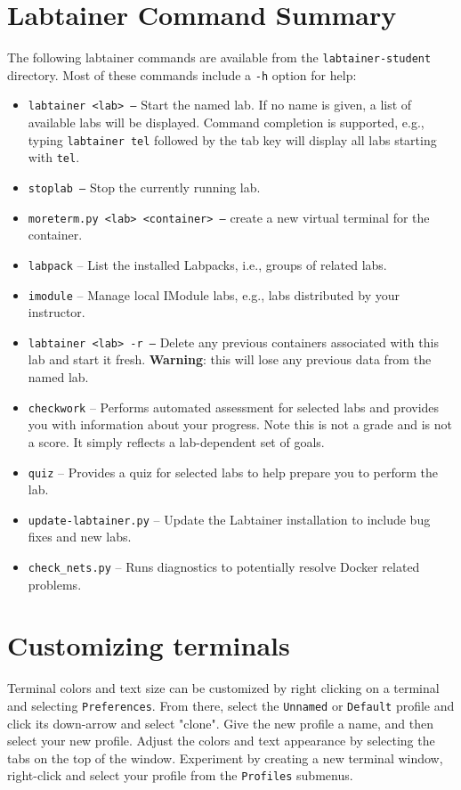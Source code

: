 \documentclass[12pt]{article}
\begin{document}
\pagebreak
\begin{appendices}
{}
\setcounter{page}{3}
\section{Labtainer Command Summary}
\label{sec:appendixA}
The following labtainer commands are available from the \texttt{labtainer-student}
directory.  Most of these commands include a {\tt -h} option for help:
\begin{itemize}
\item \texttt{labtainer <lab> --}
Start the named lab.  If no name is given, a list of available labs will be displayed. Command completion is
supported, e.g., typing {\tt labtainer tel} followed by the tab key will display all labs starting with {\tt tel}.
\item \texttt{stoplab  --} Stop the currently running lab.
\item \texttt{moreterm.py <lab> <container> --} create a new virtual terminal for the container.
\item \texttt{labpack} -- List the installed Labpacks, i.e., groups of related labs.
\item \texttt{imodule} -- Manage local IModule labs, e.g., labs distributed by your instructor.
\item \texttt{labtainer <lab> -r --}
Delete any previous containers associated with this lab and start it fresh.  \textbf{Warning}: this will lose any
previous data from the named lab.
\item \texttt{checkwork} -- Performs automated assessment for selected labs and provides you with information about your progress.
Note this is not a grade and is not a score.  It simply reflects a lab-dependent set of goals.
\item \texttt{quiz} -- Provides a quiz for selected labs to help prepare you to perform the lab.
\item \texttt{update-labtainer.py} -- Update the Labtainer installation to include bug fixes and new labs.
\item \texttt{check\_nets.py} -- Runs diagnostics to potentially resolve Docker related problems.

\end{itemize}

\section{Customizing terminals}
\label{sec:appendixB}
Terminal colors and text size can be customized by right clicking on a terminal and selecting {\tt Preferences}.  From there, select
the {\tt Unnamed} or {\tt Default} profile and click its down-arrow and select "clone".  Give the new profile a name, and then
select your new profile.  Adjust the colors and text appearance by selecting the tabs on the top of the window.  Experiment
by creating a new terminal window, right-click and select your profile from the {\tt Profiles} submenus.


\end{appendices}
\end{document}
